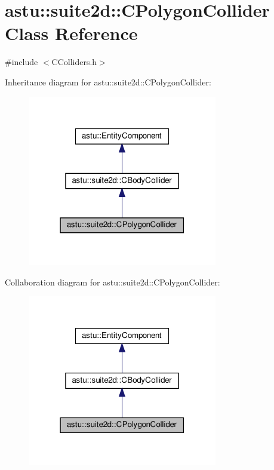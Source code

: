 \hypertarget{classastu_1_1suite2d_1_1CPolygonCollider}{}\section{astu\+:\+:suite2d\+:\+:C\+Polygon\+Collider Class Reference}
\label{classastu_1_1suite2d_1_1CPolygonCollider}


{\ttfamily \#include $<$C\+Colliders.\+h$>$}



Inheritance diagram for astu\+:\+:suite2d\+:\+:C\+Polygon\+Collider\+:\nopagebreak
\begin{figure}[H]
\begin{center}
\leavevmode
\includegraphics[width=235pt]{classastu_1_1suite2d_1_1CPolygonCollider__inherit__graph}
\end{center}
\end{figure}


Collaboration diagram for astu\+:\+:suite2d\+:\+:C\+Polygon\+Collider\+:\nopagebreak
\begin{figure}[H]
\begin{center}
\leavevmode
\includegraphics[width=235pt]{classastu_1_1suite2d_1_1CPolygonCollider__coll__graph}
\end{center}
\end{figure}

